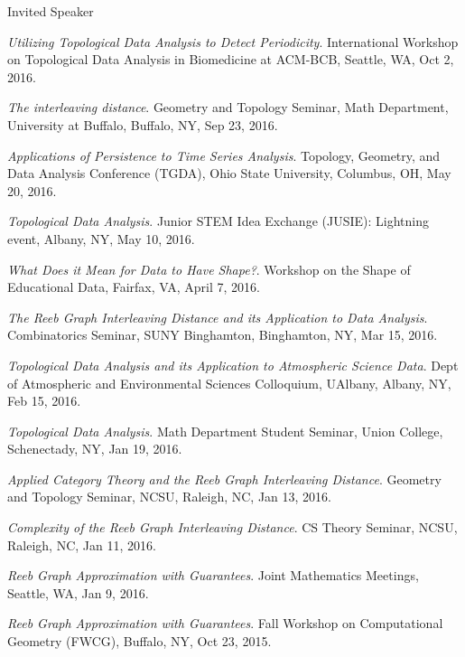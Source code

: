 \documentclass{resume} %
\begin{document}
\begin{rSection}{Invited Speaker}
\begin{etaremune}
\item\emph{Utilizing Topological Data Analysis to Detect Periodicity}. International Workshop on Topological Data Analysis in Biomedicine at ACM-BCB, Seattle, WA, Oct 2, 2016. 

\item\emph{The interleaving distance}. Geometry and Topology Seminar, Math Department, University at Buffalo, Buffalo, NY, Sep 23, 2016. 

\item\emph{Applications of Persistence to Time Series Analysis}. Topology, Geometry, and Data Analysis Conference (TGDA), Ohio State University, Columbus, OH, May 20, 2016. 

\item\emph{Topological Data Analysis}. Junior STEM Idea Exchange (JUSIE): Lightning event, Albany, NY, May 10, 2016. 

\item\emph{What Does it Mean for Data to Have Shape?}. Workshop on the Shape of Educational Data, Fairfax, VA, April 7, 2016. 

\item\emph{The Reeb Graph Interleaving Distance and its Application to Data Analysis}. Combinatorics Seminar, SUNY Binghamton, Binghamton, NY, Mar 15, 2016. 

\item\emph{Topological Data Analysis and its Application to Atmospheric Science Data}. Dept of Atmospheric and Environmental Sciences Colloquium, UAlbany, Albany, NY, Feb 15, 2016. 

\item\emph{Topological Data Analysis}. Math Department Student Seminar, Union College, Schenectady, NY, Jan 19, 2016. 

\item\emph{Applied Category Theory and the Reeb Graph Interleaving Distance}. Geometry and Topology Seminar, NCSU, Raleigh, NC, Jan 13, 2016. 

\item\emph{Complexity of the Reeb Graph Interleaving Distance}. CS Theory Seminar, NCSU, Raleigh, NC, Jan 11, 2016. 

\item\emph{Reeb Graph Approximation with Guarantees}. Joint Mathematics Meetings, Seattle, WA, Jan 9, 2016. 

\item\emph{Reeb Graph Approximation with Guarantees}. Fall Workshop on Computational Geometry (FWCG), Buffalo, NY, Oct 23, 2015. 


\end{etaremune}
\end{rSection}
\end{document}
